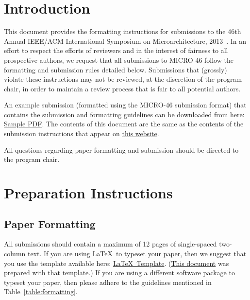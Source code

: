 \section{Introduction}

This document provides the formatting instructions for submissions to the 46th
Annual IEEE/ACM International Symposium on Microarchitecture,
2013~\cite{micro46}. In an effort to respect the efforts of reviewers and in
the interest of fairness to all prospective authors, we request that all
submissions to MICRO-46 follow the formatting and submission rules detailed
below.  Submissions that (grossly) violate these instructions may not be
reviewed, at the discretion of the program chair, in order to maintain a review
process that is fair to all potential authors.

An example submission (formatted using the MICRO-46 submission format) that
contains the submission and formatting guidelines can be downloaded from here:
\href{http://www.microarch.org/micro46/files/micro46-template.pdf}{Sample
PDF}. The contents of this document are the same as the contents of the
submission instructions that appear on
\href{http://www.microarch.org/micro46/submission.html}{this website}.

All questions regarding paper formatting and submission should be directed to
the program chair.

\section{Preparation Instructions}

\subsection{Paper Formatting} 

All submissions should contain a maximum of 12 pages of single-spaced
two-column text. If you are using \LaTeX~to typeset your paper, then we suggest
that you use the template available here:
\href{http://www.microarch.org/micro46/files/micro46-latex-template.tar.gz}{\LaTeX~Template}.
(\href{http://www.microarch.org/micro46/files/micro46-template.pdf}{This
document} was prepared with that template.)  If you are using a different
software package to typeset your paper, then please adhere to the guidelines
mentioned in Table~\ref{table:formatting}.

